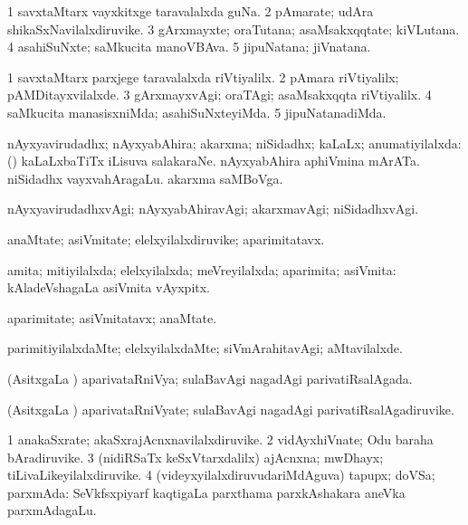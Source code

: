 \bentry
{}
\gl{\nA}
\bmng
\bnum
\num{1} savxtaMtarx vayxkitxge taravalalxda guNa. 
\num{2} pAmarate; udAra shikaSxNavilalxdiruvike. 
\num{3} gArxmayxte; oraTutana; asaMsakxqqtate; kiVLutana. 
\num{4} asahiSuNxte; saMkucita manoVBAva. 
\num{5} jipuNatana; jiVnatana. 
\enum
\emng
\eentry

\bentry
{}
\gl{\kirxvi}
\bmng
\bnum
\num{1} savxtaMtarx parxjege taravalalxda riVtiyalilx. 
\num{2} pAmara riVtiyalilx; pAMDitayxvilalxde. 
\num{3} gArxmayxvAgi; oraTAgi; asaMsakxqqta riVtiyalilx. 
\num{4} saMkucita manasisxniMda; asahiSuNxteyiMda. 
\num{5} jipuNatanadiMda. 
\enum
\emng
\eentry

\bentry
{}
\gl{\gu}
\bmng
nAyxyavirudadhx; nAyxyabAhira; akarxma; niSidadhx; kaLaLx; anumatiyilalxda: (\kanmu)  kaLaLxbaTiTx iLisuva salakaraNe.  nAyxyabAhira aphiVmina mArATa.  niSidadhx vayxvahAragaLu.  akarxma saMBoVga. 
\emng
\eentry

\bentry
{}
\gl{\kirxvi}
\bmng
nAyxyavirudadhxvAgi; nAyxyabAhiravAgi; akarxmavAgi; niSidadhxvAgi. 
\emng
\eentry

\bentry
{}
\gl{\nA}
\bmng
anaMtate; asiVmitate; elelxyilalxdiruvike; aparimitatavx. 
\emng
\eentry

\bentry
{}
\gl{\gu}
\bmng
amita; mitiyilalxda; elelxyilalxda; meVreyilalxda; aparimita; asiVmita:  kAladeVshagaLa asiVmita vAyxpitx. 
\emng
\eentry

\bentry
{}
\gl{\nA}
\bmng
aparimitate; asiVmitatavx; anaMtate. 
\emng
\eentry

\bentry
{}
\gl{\kirxvi}
\bmng
parimitiyilalxdaMte; elelxyilalxdaMte; siVmArahitavAgi; aMtavilalxde. 
\emng
\eentry

\bentry
{}
\gl{\gu}
\bmng
(AsitxgaLa \vi) aparivataRniVya; sulaBavAgi nagadAgi parivatiRsalAgada. 
\emng
\eentry

\bentry
{}
\gl{\nA}
\bmng
(AsitxgaLa \vi) aparivataRniVyate; sulaBavAgi nagadAgi parivatiRsalAgadiruvike. 
\emng
\eentry

\bentry
{}
\gl{\nA}
\bmng
\bnum
\num{1} anakaSxrate; akaSxrajAcnxnavilalxdiruvike. 
\num{2} vidAyxhiVnate; Odu baraha bAradiruvike. 
\num{3} (nidiRSaTx keSxVtarxdalilx) ajAcnxna; mwDhayx; tiLivaLikeyilalxdiruvike. 
\num{4} (videyxyilalxdiruvudariMdAguva) tapupx; doVSa; parxmAda:  SeVkfsxpiyarf kaqtigaLa parxthama parxkAshakara aneVka parxmAdagaLu. 
\enum
\emng
\eentry

